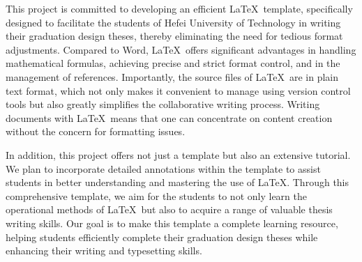\newcommand{\keywordsCn}[1][\LaTeX 模版；合肥工业大学；教程]{#1}
\begin{abstract}
    本项目致力于开发一个高效的 \LaTeX 模板，旨在为合肥工业大学的同学们撰写毕业设计论文提供便利，从而免去繁琐的格式调整工作。相比于 Word，\LaTeX 在处理数学公式、实现精确严格的格式控制，以及管理参考文献方面展现出显著优势。重要的是，\LaTeX 的源文件为纯文本格式，这不仅方便使用版本控制工具进行管理，还极大地简化了协作写作过程。采用 \LaTeX 编写文档意味着可以将注意力集中在内容创作上，而无需担心格式问题。
    
    此外，本项目不仅提供一个模板，还包括一个全面的教程。我们将在模板中加入详尽的注释，以辅助同学们更好地理解和掌握 \LaTeX 的使用技巧。我们希望通过这个综合性的模板，同学们不仅能够学习到 \LaTeX 的操作方法，还能掌握一系列有价值的论文写作技巧。我们的目标是让这个模板成为一个完善的学习资源，帮助同学们高效地完成他们的毕业设计论文，同时提升写作和排版能力。
\end{abstract}

\newcommand{\keywordsEn}[1][\LaTeX\ Template, HFUT, Tutorial]{#1}
\begin{abstractEn}
    This project is committed to developing an efficient \LaTeX\ template, specifically designed to facilitate the students of Hefei University of Technology in writing their graduation design theses, thereby eliminating the need for tedious format adjustments. Compared to Word, \LaTeX\ offers significant advantages in handling mathematical formulas, achieving precise and strict format control, and in the management of references. Importantly, the source files of \LaTeX\ are in plain text format, which not only makes it convenient to manage using version control tools but also greatly simplifies the collaborative writing process. Writing documents with \LaTeX\ means that one can concentrate on content creation without the concern for formatting issues.
    
    In addition, this project offers not just a template but also an extensive tutorial. We plan to incorporate detailed annotations within the template to assist students in better understanding and mastering the use of \LaTeX. Through this comprehensive template, we aim for the students to not only learn the operational methods of \LaTeX\ but also to acquire a range of valuable thesis writing skills. Our goal is to make this template a complete learning resource, helping students efficiently complete their graduation design theses while enhancing their writing and typesetting skills.
\end{abstractEn}